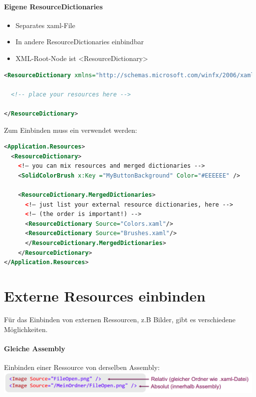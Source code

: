 \paragraph{Eigene ResourceDictionaries}
\begin{itemize}
    \item Separates xaml-File
    \item In andere ResourceDictionaries einbindbar
    \item XML-Root-Node ist <ResourceDictionary>
\end{itemize}
\begin{lstlisting}[language=xml]
<ResourceDictionary xmlns="http://schemas.microsoft.com/winfx/2006/xaml/presentation" xmlns:x="http://schemas.microsoft.com/winfx/2006/xaml" xmlns:local="clr-namespace:Microsoft.FamilyShow"> 

  <!-- place your resources here --> 
  
</ResourceDictionary> 
\end{lstlisting}

Zum Einbinden muss ein  verwendet werden:
\begin{lstlisting}[language=xml]
<Application.Resources>
  <ResourceDictionary>
    <!– you can mix resources and merged dictionaries -->
    <SolidColorBrush x:Key ="MyButtonBackground" Color="#EEEEEE" />
   
    <ResourceDictionary.MergedDictionaries>
      <!– just list your external resource dictionaries, here --> 
      <!– (the order is important!) -->
      <ResourceDictionary Source="Colors.xaml"/>
      <ResourceDictionary Source="Brushes.xaml"/>
      </ResourceDictionary.MergedDictionaries>
    </ResourceDictionary>
</Application.Resources> 
\end{lstlisting}

\section{Externe Resources einbinden}
Für das Einbinden von externen Ressourcen, z.B Bilder, gibt es verschiedene Möglichkeiten.
\paragraph{Gleiche Assembly}
Einbinden einer Ressource von derselben Assembly:
\includegraphics[scale=0.18]{img/resource-same-assembly.png}


